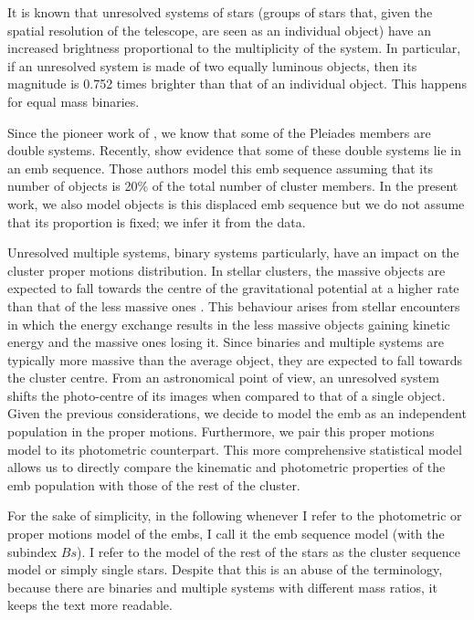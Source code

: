 It is known that unresolved systems of stars (groups of stars that, given the spatial resolution of the telescope, are seen as an individual object) have an increased brightness proportional to the multiplicity of the system. In particular, if an unresolved system is made of two equally luminous objects, then its magnitude is 0.752 times brighter than that of an individual object. This happens for equal mass binaries.

Since the pioneer work of \citet{Trumpler1921}, we know that some of the Pleiades members are double systems. Recently, \citet{Sarro2014} show evidence that some of these double systems lie in an \gls{emb} sequence. Those authors model this \gls{emb} sequence assuming that its number of objects is 20\% of the total number of cluster members. In the present work, we also model objects is this displaced \gls{emb} sequence  but we do not assume that its proportion is fixed; we infer it from the data. 

Unresolved multiple systems, binary systems particularly, have an impact on the cluster proper motions distribution. In stellar clusters, the massive objects are expected to fall towards the centre of the gravitational potential at a higher rate than that of the less massive ones {\cite[see for example][p. 556]{Binney2008}}. This behaviour arises from stellar encounters in which the energy exchange results in the less massive objects gaining kinetic energy and the massive ones losing it. {Since binaries and multiple systems are typically more massive than the average object, they are expected to fall towards the cluster centre.} From an astronomical point of view, an unresolved system shifts the photo-centre of its images when compared to that of a single object. Given the previous considerations, we decide to model the \gls{emb} as an independent population in the proper motions. Furthermore, we pair this proper motions model to its photometric counterpart. This more comprehensive statistical model allows us to directly compare the kinematic and photometric properties of the \gls{emb} population with those of the rest of the cluster. 

For the sake of simplicity, in the following whenever I refer to the photometric or proper motions model of the \gls{emb}s, I call it the \gls{emb} sequence model (with the subindex $Bs$). I refer to the model of the rest of the stars as the cluster sequence model or simply single stars. Despite that this is an abuse of the terminology, because there are binaries and multiple systems with different mass ratios, it keeps the text more readable.

